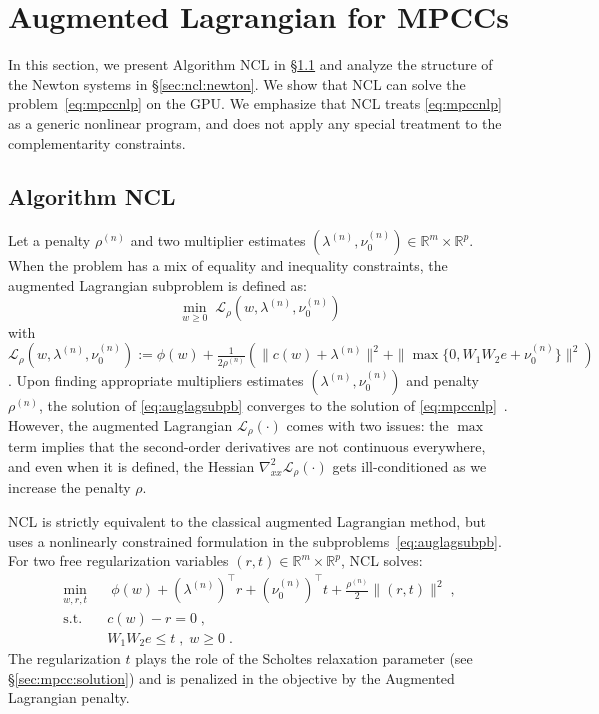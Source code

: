 \documentclass{IEEEtran4PSCC}
\newcommand{\add}[1]{#1}
\begin{document}
\section{Augmented Lagrangian for MPCCs}
In this section, we present Algorithm NCL in \S\ref{sec:ncl:ncl} and
analyze the structure of the Newton systems in \S\ref{sec:ncl:newton}.
We show that NCL can solve the problem~\eqref{eq:mpccnlp} on the GPU.
\add{We emphasize that NCL treats \eqref{eq:mpccnlp} as a generic nonlinear program, and does not
apply any special treatment to the complementarity constraints.}

\subsection{Algorithm NCL}
\label{sec:ncl:ncl}
\add{Let a penalty $\rho^{(n)}$
and two multiplier estimates $(\lambda^{(n)}, \nu_0^{(n)}) \in \mathbb{R}^m \times \mathbb{R}^p$.
When the problem has a mix of equality and inequality constraints,
the augmented Lagrangian subproblem is defined as:
\begin{equation}
  \label{eq:auglagsubpb}
  \min_{w \geq 0} \;  \mathcal{L}_\rho(w, \lambda^{(n)}, \nu^{(n)}_0)
\end{equation}
with $\mathcal{L}_\rho(w, \lambda^{(n)}, \nu^{(n)}_0) := \phi(w) + \frac{1}{2\rho^{(n)}} ( \| c(w) + \lambda^{(n)} \|^2 + \|\max\{ 0, W_1 W_2e + \nu_0^{(n)} \} \|^2 )$.
Upon finding appropriate multipliers estimates $(\lambda^{(n)}, \nu_0^{(n)})$ and penalty $\rho^{(n)}$,
the solution of \eqref{eq:auglagsubpb} converges to the solution of \eqref{eq:mpccnlp}~\cite{izmailov2012global}.
However, the augmented Lagrangian $\mathcal{L}_\rho(\cdot)$ comes with two issues:
the $\max$ term implies that the second-order derivatives are not continuous everywhere,
and even when it is defined, the Hessian $\nabla_{x x}^2 \mathcal{L}_\rho(\cdot)$ gets ill-conditioned as we increase the penalty $\rho$.}

NCL is strictly equivalent to the classical augmented Lagrangian method,
but uses a nonlinearly constrained formulation in the subproblems~\eqref{eq:auglagsubpb}.
For two free regularization variables $(r, t) \in \mathbb{R}^m \times \mathbb{R}^p$, NCL solves:
\begin{equation}
  \label{eq:nclsubpb}
  \begin{aligned}
    \min_{w, r, t} \; & \;   \phi(w) + (\lambda^{(n)})^\top r  + (\nu_0^{(n)})^\top t +  \frac{\rho^{(n)}}{2}\|(r, t) \|^2  \; , \\
    \text{s.t.} \quad & c(w) - r = 0 \; , \\
                      & W_1 W_2 e \leq t  \; , \; w \geq 0 \; .
  \end{aligned}
\end{equation}
\add{The regularization $t$ plays the role of the Scholtes relaxation parameter (see \S\ref{sec:mpcc:solution})}
and is penalized in the objective by the Augmented Lagrangian penalty.
\end{document}
